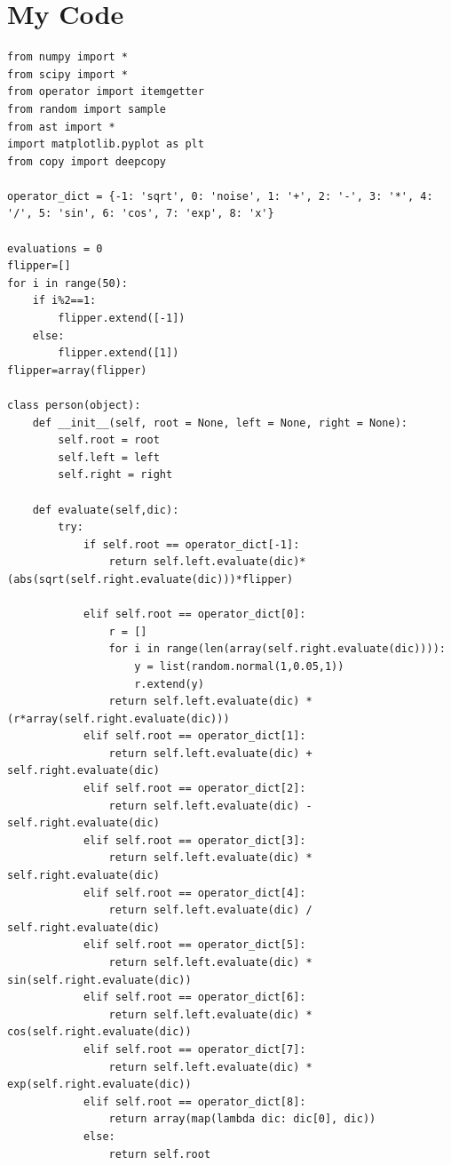 \documentclass[11pt,amsmath,amssymb]{revtex4}
\begin{document}
\section{My Code}
\begin{lstlisting}
from numpy import *
from scipy import *
from operator import itemgetter
from random import sample
from ast import *
import matplotlib.pyplot as plt
from copy import deepcopy

operator_dict = {-1: 'sqrt', 0: 'noise', 1: '+', 2: '-', 3: '*', 4: '/', 5: 'sin', 6: 'cos', 7: 'exp', 8: 'x'}

evaluations = 0
flipper=[]
for i in range(50):
    if i%2==1:
        flipper.extend([-1])
    else:
        flipper.extend([1])
flipper=array(flipper)

class person(object):
    def __init__(self, root = None, left = None, right = None):
        self.root = root
        self.left = left
        self.right = right
    
    def evaluate(self,dic):
        try:
            if self.root == operator_dict[-1]:
                return self.left.evaluate(dic)*(abs(sqrt(self.right.evaluate(dic)))*flipper)

            elif self.root == operator_dict[0]:
                r = []
                for i in range(len(array(self.right.evaluate(dic)))):
                    y = list(random.normal(1,0.05,1))
                    r.extend(y)
                return self.left.evaluate(dic) * (r*array(self.right.evaluate(dic)))
            elif self.root == operator_dict[1]:
                return self.left.evaluate(dic) + self.right.evaluate(dic)
            elif self.root == operator_dict[2]:
                return self.left.evaluate(dic) - self.right.evaluate(dic)
            elif self.root == operator_dict[3]:
                return self.left.evaluate(dic) * self.right.evaluate(dic)
            elif self.root == operator_dict[4]:
                return self.left.evaluate(dic) / self.right.evaluate(dic)
            elif self.root == operator_dict[5]:
                return self.left.evaluate(dic) * sin(self.right.evaluate(dic))
            elif self.root == operator_dict[6]:
                return self.left.evaluate(dic) * cos(self.right.evaluate(dic))
            elif self.root == operator_dict[7]:
                return self.left.evaluate(dic) * exp(self.right.evaluate(dic))
            elif self.root == operator_dict[8]:
                return array(map(lambda dic: dic[0], dic))
            else:
                return self.root


\end{lstlisting}
\end{document}

